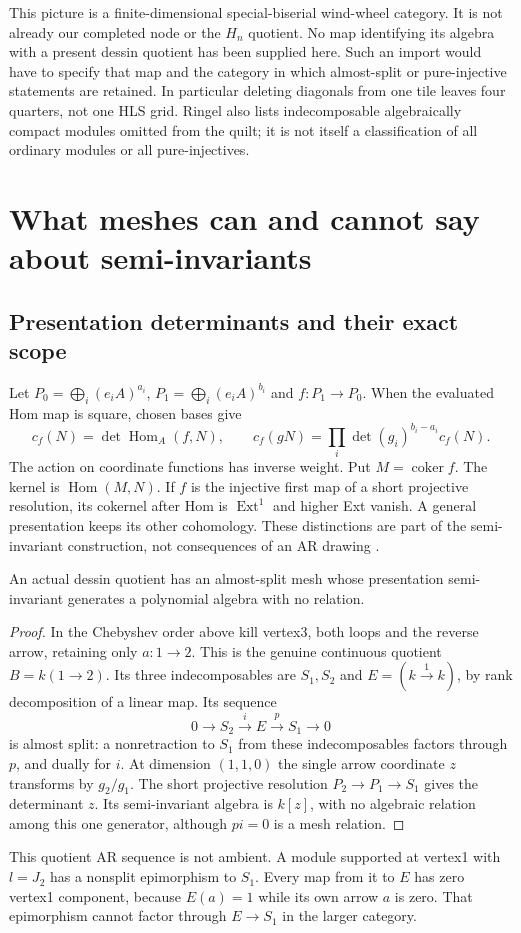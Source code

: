 This picture is a finite-dimensional special-biserial wind-wheel category.
It is not already our completed node or the $H_n$ quotient. No map identifying
its algebra with a present dessin quotient has been supplied here. Such an
import would have to specify that map and the category in which almost-split
or pure-injective statements are retained. In particular deleting diagonals
from one tile leaves four quarters, not one HLS grid. Ringel also lists
indecomposable algebraically compact modules omitted from the quilt; it is not
itself a classification of all ordinary modules or all pure-injectives.

\section[Meshes and semi-invariants]{What meshes can and cannot say about semi-invariants}
\subsection{Presentation determinants and their exact scope}
Let $P_0=\bigoplus_i(e_iA)^{a_i}$, $P_1=\bigoplus_i(e_iA)^{b_i}$ and
$f:P_1\to P_0$. When the evaluated Hom map is square, chosen bases give
\[
 c_f(N)=\det\operatorname{Hom}_A(f,N),\qquad
 c_f(gN)=\prod_i\det(g_i)^{b_i-a_i}c_f(N).
\]
The action on coordinate functions has inverse weight. Put $M=\operatorname{coker}f$.
The kernel is $\operatorname{Hom}(M,N)$. If $f$ is the injective first map of a
short projective resolution, its cokernel after Hom
is $\operatorname{Ext}^1$ and higher Ext vanish. A general presentation keeps
its other cohomology. These distinctions are part of the semi-invariant
construction, not consequences of an AR drawing \cite{ARBSchofield}.

\begin{proposition}
\label{arb:freegenerator}
An actual dessin quotient has an almost-split mesh whose presentation
semi-invariant generates a polynomial algebra with no relation.
\end{proposition}
\begin{proof}
In the Chebyshev order above kill vertex3, both loops and the reverse arrow,
retaining only $a:1\to2$. This is the genuine continuous quotient
$B=k(1\to2)$. Its three indecomposables are $S_1,S_2$ and
$E=(k\xrightarrow1k)$, by rank decomposition of a linear map. Its sequence
\[
 0\to S_2\xrightarrow{i}E\xrightarrow{p}S_1\to0
\]
is almost split: a nonretraction to $S_1$ from these indecomposables factors
through $p$, and dually for $i$. At dimension $(1,1,0)$ the single arrow
coordinate $z$ transforms by $g_2/g_1$. The short projective resolution
$P_2\to P_1\to S_1$ gives the determinant $z$. Its semi-invariant algebra
is $k[z]$, with no algebraic relation among this one generator, although
$p i=0$ is a mesh relation.
\end{proof}
This quotient AR sequence is not ambient. A module supported at vertex1
with $l=J_2$ has a nonsplit epimorphism to $S_1$. Every map from it to $E$
has zero vertex1 component, because $E(a)=1$ while its own arrow $a$ is zero.
That epimorphism cannot factor through $E\to S_1$ in the larger category.

